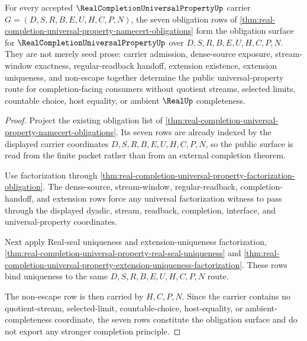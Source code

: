\begin{theorem}
\label{thm:real-completion-universal-property-obligation-upgrade}
For every accepted $\RealCompletionUniversalPropertyUp$ carrier $G=(D,S,R,B,E,U,H,C,P,N)$, the seven obligation rows of \autoref{thm:real-completion-universal-property-namecert-obligations} form the obligation surface for $\RealCompletionUniversalPropertyUp$ over $D,S,R,B,E,U,H,C,P,N$. They are not merely seed prose: carrier admission, dense-source exposure, stream-window exactness, regular-readback handoff, extension existence, extension uniqueness, and non-escape together determine the public universal-property route for completion-facing consumers without quotient streams, selected limits, countable choice, host equality, or ambient $\RealUp$ completeness.
\end{theorem}
\begin{proof}
Project the existing obligation list of \autoref{thm:real-completion-universal-property-namecert-obligations}. Its seven rows are already indexed by the displayed carrier coordinates $D,S,R,B,E,U,H,C,P,N$, so the public surface is read from the finite packet rather than from an external completion theorem.

Use factorization through \autoref{thm:real-completion-universal-property-factorization-obligation}. The dense-source, stream-window, regular-readback, completion-handoff, and extension rows force any universal factorization witness to pass through the displayed dyadic, stream, readback, completion, interface, and universal-property coordinates.

Next apply Real-seal uniqueness and extension-uniqueness factorization, \autoref{thm:real-completion-universal-property-real-seal-uniqueness} and \autoref{thm:real-completion-universal-property-extension-uniqueness-factorization}. These rows bind uniqueness to the same $D,S,R,B,E,U,H,C,P,N$ route.

The non-escape row is then carried by $H,C,P,N$. Since the carrier contains no quotient-stream, selected-limit, countable-choice, host-equality, or ambient-completeness coordinate, the seven rows constitute the obligation surface and do not export any stronger completion principle.
\end{proof}

